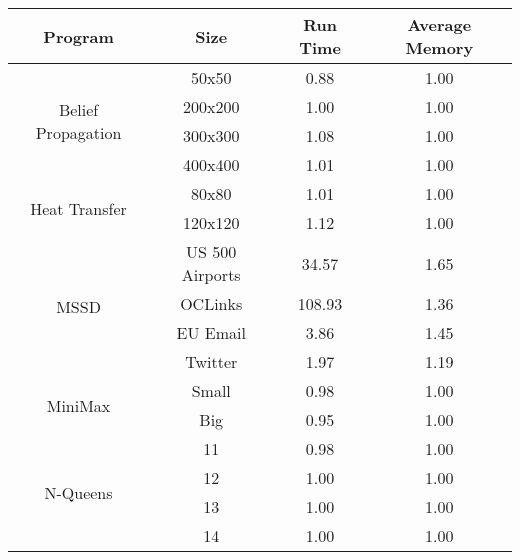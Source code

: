\begin{tabular}{c | c || c | c} \hline
	\textbf{Program} & \textbf{Size} & \textbf{Run Time} & \textbf{Average Memory}\\ \hline \hline
	\multirow{4}{*}{Belief Propagation}  & 50x50 &  0.88  &  1.00
  \\
		 & 200x200 &  1.00  &  1.00
  \\
		 & 300x300 &  1.08  &  1.00
  \\
		 & 400x400 &  1.01  &  1.00
  \\
	\hline
	\multirow{2}{*}{Heat Transfer}  & 80x80 &  1.01  &  1.00
  \\
		 & 120x120 &  1.12  &  1.00
  \\
	\hline
	\multirow{4}{*}{MSSD}  & US 500 Airports &  34.57  &  1.65
  \\
		 & OCLinks &  108.93  &  1.36
  \\
		 & EU Email &  3.86  &  1.45
  \\
		 & Twitter &  1.97  &  1.19
  \\
	\hline
	\multirow{2}{*}{MiniMax}  & Small &  0.98  &  1.00
  \\
		 & Big &  0.95  &  1.00
  \\
	\hline
	\multirow{4}{*}{N-Queens}  & 11 &  0.98  &  1.00
  \\
		 & 12 &  1.00  &  1.00
  \\
		 & 13 &  1.00  &  1.00
  \\
		 & 14 &  1.00  &  1.00
  \\
	\hline
\end{tabular}

